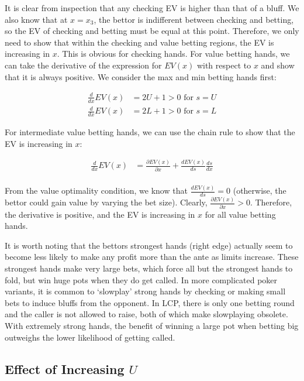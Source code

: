 \documentclass[../../main/main.tex]{subfiles}
\begin{document}
\begin{customproof}
    It is clear from inspection that any checking EV is higher than that of a bluff. We also know that at $x=x_3$, the bettor is indifferent between checking and betting, so the EV of checking and betting must be equal at this point. Therefore, we only need to show that within the checking and value betting regions, the EV is increasing in $x$. This is obvious for checking hands. For value betting hands, we can take the derivative of the expression for $EV(x)$ with respect to $x$ and show that it is always positive. We consider the max and min betting hands first:
    
    \begin{align*}
        \frac{d}{dx} EV(x) & = 2U + 1 > 0 \text{ for } s = U \\
        \frac{d}{dx} EV(x) & = 2L + 1 > 0 \text{ for } s = L
    \end{align*}
    
    For intermediate value betting hands, we can use the chain rule to show that the EV is increasing in $x$:
    
    \begin{align*}
        \frac{d}{dx} EV(x) & = \frac{\partial EV(x)}{\partial x} + \frac{dEV(x)}{ds} \frac{d s}{d x} \\
    \end{align*}

    From the value optimality condition, we know that $\frac{dEV(x)}{ds} = 0$ (otherwise, the bettor could gain value by varying the bet size). Clearly, $\frac{\partial EV(x)}{\partial x} > 0$.  Therefore, the derivative is positive, and the EV is increasing in $x$ for all value betting hands.
\end{customproof}

It is worth noting that the bettors strongest hands (right edge) actually seem to become less likely to make any profit more than the ante as limits increase. These strongest hands make very large bets, which force all but the strongest hands to fold, but win huge pots when they do get called. In more complicated poker variants, it is common to `slowplay' strong hands by checking or making small bets to induce bluffs from the opponent. In LCP, there is only one betting round and the caller is not allowed to raise, both of which make slowplaying obsolete. With extremely strong hands, the benefit of winning a large pot when betting big outweighs the lower likelihood of getting called.

\subsection{Effect of Increasing $U$}
\end{document}
